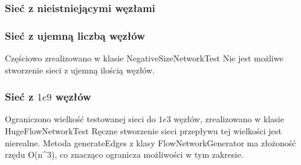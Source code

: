 \subsubsection{Sieć z nieistniejącymi węzłami}


\subsubsection{Sieć z ujemną liczbą węzłów}
Częściowo zrealizowano w klasie NegativeSizeNetworkTest Nie jest możliwe
stworzenie sieci z ujemną ilością węzłów.

\subsubsection{Sieć z $1e9$ węzłów}
Ograniczono wielkość testowanej sieci do $1e3$ węzłów, zrealizowano w klasie
HugeFlowNetworkTest Ręczne stworzenie sieci przepływu tej wielkości jest
nierealne. Metoda generateEdges z klasy FlowNetworkGenerator ma złożoność
rzędu O(n^3), co znacząco ogranicza możliwości w tym zakresie.

